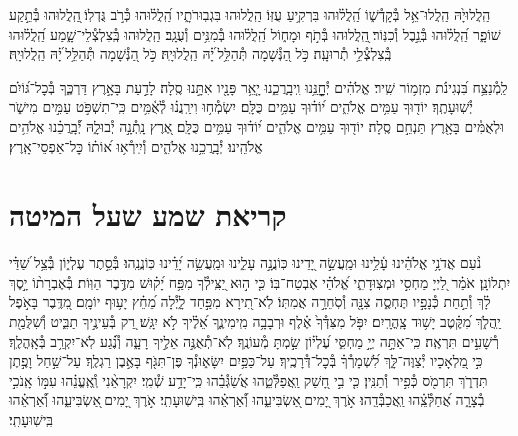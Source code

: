 \documentclass[twoside, openany, parskip=half, 11pt]{book}
\begin{document}
הַֽלֲלוּיָ֙הּ הַֽלֲלוּ־אֵ֥ל בְּ֯קָדְ֯שׁ֑וֹ הַֽ֝לֲל֗וּהוּ בִּרְקִ֥יעַ עֻזּֽוֹ׃
הַֽלֲלוּהוּ בִּגְבֽוּרֹתָ֑יו הַֽ֝לֲל֗וּהוּ כְּ֯רֹ֣ב גֻּדְלֽוֹ׃
֖הַֽלֲלוּהוּ בְּ֯תֵ֣קַע שׁוֹפָ֑ר הַֽ֝לֲל֗וּהוּ בְּ֯נֵ֣בֶל וְ֯כִנּֽוֹר׃
֖הַֽלֲלוּהוּ בְּ֯תֹ֣ף וּמָח֑וֹל הַֽ֝לֲל֗וּהוּ בְּ֯מִנִּ֥ים וְ֯עֻגָֽב׃
הַֽלֲלוּהוּ בְּֽ֯צִלְצְ֯לֵי־שָׁ֑מַע הַֽ֝לֲל֗וּהוּ בְּֽ֯צִלְצְ֯לֵ֥י תְ֯רוּעָֽה׃
כֹּ֣ל הַ֭נְּ֯שָׁמָה תְּ֯הַלֵּ֥ל ֝יָ֗הּ הַֽלֲלוּיָֽהּ׃
כֹּ֣ל הַ֭נְּ֯שָׁמָה תְּ֯הַלֵּ֥ל ֝יָ֗הּ הַֽלֲלוּיָֽהּ׃

\enlargethispage{\baselineskip}
לַֽמְ֯נַצֵּ֥ח
בִּ֝נְגִינֹ֗ת מִזְמ֥וֹר שִֽׁיר׃ אֱלֹהִ֗ים יְ֯חׇׇׇׇׇׇנֵּ֥נוּ וִֽיבָֽרֲכֵ֑נוּ יָ֤אֵ֥ר פָּנָ֖יו אִתָּ֣נוּ סֶֽלָה׃ לָדַ֣עַת בָּאָ֣רֶץ דַּרְכֶּ֑ךָ בְּ֯כׇל־גּ֝וֹיִ֗ם יְ֯שֽׁוּעָתֶֽךָ׃ יוֹד֖וּךָ עַמִּ֥ים אֱלֹהִ֑ים י֝וֹד֗וּךָ עַמִּ֥ים כֻּלָּֽם׃ יִשְׂמְ֯ח֥וּ וִירַֽנֲנ֗וּ לְ֯אֻ֫מִּ֥ים כִּֽי־תִשְׁפֹּ֣ט עַמִּ֣ים מִישֹׁ֑ר וּלְאֻמִּ֓ים בָּאָ֖רֶץ תַּנְחֵ֣ם סֶֽלָה׃ יוֹד֖וּךָ עַמִּ֥ים אֱלֹהִ֑ים י֝וֹד֗וּךָ עַמִּ֥ים כֻּלָּֽם׃ אֶ֭רֶץ נָֽתְ֯נָ֣ה יְ֯בוּלָ֑הּ יְ֝֯בָֽרֲכֵ֗נוּ אֱלֹהִ֥ים אֱלֹהֵֽינוּ׃ יְ֯בָֽרֲכֵ֥נוּ אֱלֹהִ֑ים וְ֯יִֽירְ֯א֥וּ א֝וֹת֗וֹ כׇּל־אַפְסֵי־אָֽרֶץ׃


\chapter[קריאת שמע שעל המיטה]{ קריאת שמע שעל המיטה }

\shema

\veahavta

נֹ֨עַם אֲדֹנָ֥י אֱלֹהֵ֗ינוּ עָ֫לֵ֥ינוּ וּמַֽעֲשֵׂ֣ה יָ֭דֵינוּ כּֽוֹנֲנָ֣ה עָלֵ֑ינוּ וּמַֽעֲשֵׂ֥ה יָ֝דֵ֗ינוּ כּֽוֹנֲנֵֽהוּ׃
בְּ֯סֵ֣תֶר עֶלְי֑וֹן בְּ֯צֵ֥ל שַׁ֝דַּ֗י יִתְלוֹנָֽן׃
אֹמַ֗ר לַ֭יְיָ מַחְסִ֣י וּמְצֽוּדָתִ֑י אֱ֝לֹהַ֗י אֶבְטַח־בּֽוֹ׃
כִּ֤י ה֣וּא יַ֭צִּֽילְ֯ךָ מִפַּ֥ח יָ֝ק֗וּשׁ מִדֶּ֥בֶר הַוּֽוֹת׃
בְּ֯אֶבְרָת֨וֹ יָ֣סֶךְ לָ֗ךְ וְ֯תַ֣חַת כְּ֯נָפָ֣יו תֶּחְסֶ֑ה צִנָּ֖ה וְ֯סֹֽחֵרָ֣ה אֲמִתּֽוֹ׃
לֹֽא־תִ֭ירָא מִפַּ֣חַד לָ֑יְ֯לָה מֵ֝חֵ֗ץ יָע֥וּף יוֹמָֽם׃
מִ֭דֶּֽבֶר בָּאֹ֣פֶל יַֽהֲלֹ֑ךְ מִ֝קֶּ֗טֶב יָשׁ֥וּד צָֽהֳרָֽיִם׃
יִפֹּ֤ל מִצִּדְּ֯ךָ֙ אֶ֗לֶף וּרְבָבָ֥ה מִֽימִינֶ֑ךָ אֵ֝לֶ֗יךָ לֹ֣א יִגָּֽשׁ׃
רַ֭ק בְּ֯עֵינֶ֣יךָ תַבִּ֑יט וְ֯שִׁלֻּמַ֖ת רְ֯שָׁעִ֣ים תִּרְאֶֽה׃
כִּֽי־אַתָּ֣ה יְיָ֣ מַחְסִּ֑י עֶ֝לְי֗וֹן שַׂ֣מְתָּ מְ֯עוֹנֶֽךָ׃
לֹֽא־תְ֯אֻנֶּ֣ה אֵלֶ֣יךָ רָעָ֑ה וְ֯נֶ֗֝גַע לֹֽא־יִקְרַ֥ב בְּ֯אָֽהֳלֶֽךָ׃
כִּ֣י מַ֭לְאָכָיו יְ֯צַוֶּה־לָּ֑ךְ לִ֝שְׁמָרְ֯ךָ֗ בְּ֯כׇל־דְּ֯רָכֶֽיךָ׃
עַל־כַּפַּ֥יִם יִשָּׂא֑וּנְ֯ךָ פֶּן־תִּגֹּ֖ף בָּאֶ֣בֶן רַגְלֶֽךָ׃
עַל־שַׁ֣חַל וָפֶ֣תֶן תִּדְרֹ֑ךְ תִּרְמֹ֖ס כְּ֯פִ֣יר וְ֯תַנִּֽין׃
כִּ֤י בִ֣י חָ֭שַׁק וַֽאֲפַלְּ֯טֵ֑הוּ אֲשַׂ֝גְּ֯בֵ֗הוּ כִּֽי־יָדַ֥ע שְׁ֯מִֽי׃
יִקְרָאֵ֨נִי וְֽ֯אֶֽעֱנֵ֗הוּ עִמּ֣וֹ אָֽנֹכִ֣י בְ֯צָרָ֑ה אֲ֝חַלְּ֯צֵֽ֗הוּ וַֽאֲכַבְּ֯דֵֽהוּ׃
אֹ֣רֶךְ יָ֭מִים ֖אַשְׂבִּיעֵ֑הוּ וְ֝֯אַרְאֵ֗הוּ בִּֽישֽׁוּעָתִֽי׃
אֹ֣רֶךְ יָ֭מִים ֖אַשְׂבִּיעֵ֑הוּ וְ֝֯אַרְאֵ֗הוּ בִּֽישֽׁוּעָתִֽי׃
\end{document}
